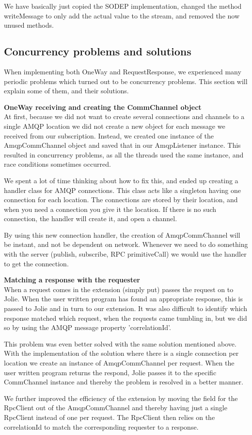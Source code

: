 We have basically just copied the SODEP implementation, changed the method writeMessage to only add the actual value to the stream, and removed the now unused methods.

\subsection{Concurrency problems and solutions}
When implementing both OneWay and RequestResponse, we experienced many periodic problems which turned out to be concurrency problems. This section will explain some of them, and their solutions.

\noindent\textbf{OneWay receiving and creating the CommChannel object}\\
At first, because we did not want to create several connections and channels to a single AMQP location we did not create a new object for each message we received from our subscription. Instead, we created one instance of the AmqpCommChannel object and saved that in our AmqpListener instance. This resulted in concurrency problems, as all the threads used the same instance, and race conditions sometimes occurred.

We spent a lot of time thinking about how to fix this, and ended up creating a handler class for AMQP connections. This class acts like a singleton having one connection for each location. The connections are stored by their location, and when you need a connection you give it the location. If there is no such connection, the handler will create it, and open a channel.

By using this new connection handler, the creation of AmqpCommChannel will be instant, and not be dependent on network. Whenever we need to do something with the server (publish, subscribe, RPC primitiveCall) we would use the handler to get the connection.

\noindent\textbf{Matching a response with the requester}\\
When a request comes in the extension (simply put) passes the request on to Jolie. When the user written program has found an appropriate response, this is passed to Jolie and in turn to our extension. It was also difficult to identify which response matched which request, when the requests came tumbling in, but we did so by using the AMQP message property 'correlationId'.

This problem was even better solved with the same solution mentioned above. With the implementation of the solution where there is a single connection per location we create an instance of AmqpCommChannel per request. When the user written program returns the respond, Jolie passes it to the specific CommChannel instance and thereby the problem is resolved in a better manner.

We further improved the efficiency of the extension by moving the field for the RpcClient out of the AmqpCommChannel and thereby having just a single RpcClient instead of one per request. The RpcClient then relies on the correlationId to match the corresponding requester to a response.
\newpage
